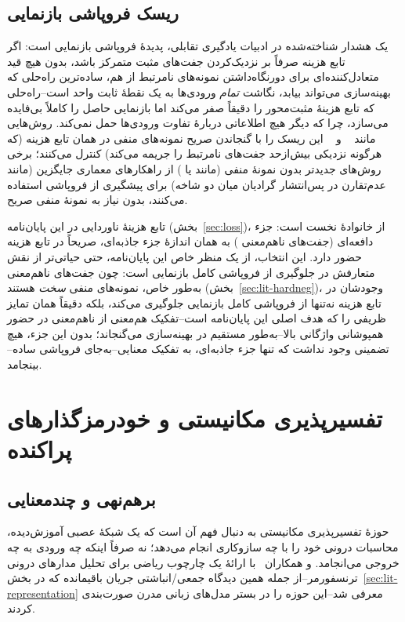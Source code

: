 \subsection{ریسک فروپاشی بازنمایی}
یک هشدار شناخته‌شده در ادبیات یادگیری تقابلی، پدیدهٔ فروپاشی بازنمایی
است: اگر تابع هزینه صرفاً بر نزدیک‌کردن جفت‌های مثبت متمرکز باشد، بدون هیچ قید متعادل‌کننده‌ای برای دورنگاه‌داشتن نمونه‌های نامرتبط از هم، ساده‌ترین راه‌حلی که بهینه‌سازی می‌تواند بیابد، نگاشت \emph{تمام} ورودی‌ها به یک نقطهٔ ثابت واحد است--راه‌حلی که تابع هزینهٔ مثبت‌محور را دقیقاً صفر می‌کند اما بازنمایی حاصل را کاملاً بی‌فایده می‌سازد، چرا که دیگر هیچ اطلاعاتی دربارهٔ تفاوت ورودی‌ها حمل نمی‌کند. روش‌هایی مانند
~\cite{chen2020simclr}
و
~\cite{oord2018cpc}
این ریسک را با گنجاندن صریح نمونه‌های منفی در همان تابع هزینه (که هرگونه نزدیکی بیش‌ازحد جفت‌های نامرتبط را جریمه می‌کند) کنترل می‌کنند؛ برخی روش‌های جدیدتر بدون نمونهٔ منفی (مانند
یا
) از راهکارهای معماری جایگزین (مانند عدم‌تقارن در پس‌انتشار گرادیان میان دو شاخه) برای پیشگیری از فروپاشی استفاده می‌کنند، بدون نیاز به نمونهٔ منفی صریح.

تابع هزینهٔ ناوردایی در این پایان‌نامه (بخش~\ref{sec:loss})، از خانوادهٔ نخست است: جزء دافعه‌ای (جفت‌های ناهم‌معنی
) به همان اندازهٔ جزء جاذبه‌ای، صریحاً در تابع هزینه حضور دارد. این انتخاب، از یک منظر خاص این پایان‌نامه، حتی حیاتی‌تر از نقش متعارفش در جلوگیری از فروپاشی کامل بازنمایی است: چون جفت‌های ناهم‌معنی
به‌طور خاص، نمونه‌های منفی \emph{سخت} هستند (بخش~\ref{sec:lit-hardneg})، وجودشان در تابع هزینه نه‌تنها از فروپاشی کامل بازنمایی جلوگیری می‌کند، بلکه دقیقاً همان تمایز ظریفی را که هدف اصلی این پایان‌نامه است--تفکیک هم‌معنی از ناهم‌معنی در حضور همپوشانی واژگانی بالا--به‌طور مستقیم در بهینه‌سازی می‌گنجاند؛ بدون این جزء، هیچ تضمینی وجود نداشت که تنها جزء جاذبه‌ای، به تفکیک معنایی--به‌جای فروپاشی ساده--بینجامد.

\section{تفسیرپذیری مکانیستی و خودرمزگذارهای پراکنده}
\label{sec:lit-interpretability}

\subsection{برهم‌نهی و چندمعنایی}
\label{sec:lit-superposition}
حوزهٔ تفسیرپذیری مکانیستی
به دنبال فهم آن است که یک شبکهٔ عصبی آموزش‌دیده، محاسبات درونی خود را با چه سازوکاری انجام می‌دهد؛ نه صرفاً اینکه چه ورودی به چه خروجی می‌انجامد.
و همکاران~\cite{elhage2021framework}
با ارائهٔ یک چارچوب ریاضی برای تحلیل مدارهای
درونی ترنسفورمر--از جمله همین دیدگاه جمعی/انباشتی جریان باقیمانده که در بخش~\ref{sec:lit-representation} معرفی شد--این حوزه را در بستر مدل‌های زبانی مدرن صورت‌بندی کردند.

